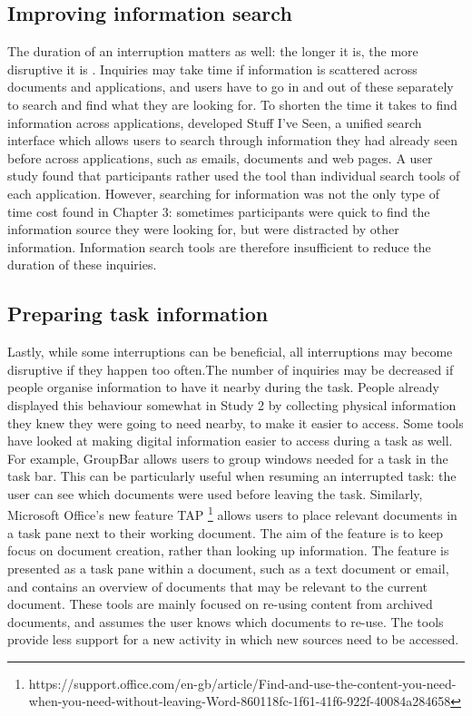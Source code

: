 \subsection{Improving information search}
The duration of an interruption matters as well: the longer it is, the more disruptive it is \citep{Altmann2017, Monk2008}. Inquiries may take time  if information is scattered across documents and applications, and users have to go in and out of these separately to search and find what they are looking for. To shorten the time it takes to find information across applications, \citet{Dumais2003} developed Stuff I’ve Seen, a unified search interface which allows users to search through information they had already seen before across applications, such as emails, documents and web pages. A user study found that participants rather used the tool than individual search tools of each application. However, searching for information was not the only type of time cost found in Chapter 3: sometimes participants were quick to find the information source they were looking for, but were distracted by other information. Information search tools are therefore insufficient to reduce the duration of these inquiries. 

\subsection{Preparing task information}
Lastly, while some interruptions can be beneficial, all interruptions may become disruptive if they happen too often.The number of inquiries may be decreased if people organise information to have it nearby during the task. People already displayed this behaviour somewhat in Study 2 by collecting physical information they knew they were going to need nearby, to make it easier to access. Some tools have looked at making digital information easier to access during a task as well. For example, GroupBar \citet{Smith2003} allows users to group windows needed for a task in the task bar. This can be particularly useful when resuming an interrupted task: the user can see which documents were used before leaving the task. Similarly, Microsoft Office’s new feature TAP \footnote{https://support.office.com/en-gb/article/Find-and-use-the-content-you-need-when-you-need-without-leaving-Word-860118fc-1f61-41f6-922f-40084a284658} allows users to place relevant documents in a task pane next to their working document. The aim of the feature is to keep focus on document creation, rather than looking up information. The feature is presented as a task pane within a document, such as a text document or email, and contains an overview of documents that may be relevant to the current document. These tools are mainly focused on re-using content from archived documents, and assumes the user knows which documents to re-use. The tools provide less support for a new activity in which new sources need to be accessed. 

